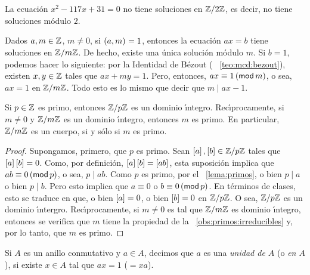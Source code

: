 \begin{ejemModulares}\label{ejem:modulares:motiva:congruencias}
	La ecuaci\'on $x^2-117x+31=0$ no tiene soluciones en $\Enterosmod[2]$,
	es decir, no tiene soluciones m\'odulo $2$.
\end{ejemModulares}

\begin{ejemModulares}\label{ejem:modulares:lineal}
	Dados $a,m\in\Enteros$, $m\neq 0$, si $\mcd{a,m}=1$, entonces la
	ecuaci\'on $ax=b$ tiene soluciones en $\Enterosmod[m]$. De hecho,
	existe una \'unica soluci\'on m\'odulo $m$. Si $b=1$, podemos
	hacer lo siguiente: por la Identidad de B\'ezout (\teoname~%
	\ref{teo:mcd:bezout}), existen $x,y\in\Enteros$ tales que $ax+my=1$.
	Pero, entonces, $ax\equiv 1\tmodulo[m]$, o sea, $ax=1$ en
	$\Enterosmod[m]$. Todo esto es lo mismo que decir que $m\mid ax-1$.
\end{ejemModulares}

\begin{coroModulares}\label{coro:modulares:primo}
	Si $p\in\Enteros$ es primo, entonces $\Enterosmod[p]$ es un dominio
	\'{\i}ntegro. Rec\'{\i}procamente, si $m\neq 0$ y $\Enterosmod[m]$
	es un dominio \'{\i}ntegro, entonces $m$ es primo. En particular,
	$\Enterosmod[m]$ es un cuerpo, si y s\'olo si $m$ es primo.
\end{coroModulares}

\begin{proof}
	Supongamos, primero, que $p$ es primo.
	Sean $\clase a,\clase b\in\Enterosmod[p]$ tales que
	$\clase a\clase b=0$. Como, por definici\'on,
	$\clase a\clase b=\clase{ab}$, esta suposici\'on implica que
	$ab\equiv 0\tmodulo[p]$, o sea, $p\mid ab$. Como $p$ es primo,
	por el \lemaname~\ref{lema:primos}, o bien $p\mid a$ o bien $p\mid b$.
	Pero esto implica que $a\equiv 0$ o $b\equiv 0\tmodulo[p]$.
	En t\'erminos de clases, esto se traduce en que, o bien
	$\clase a=0$, o bien $\clase b=0$ en $\Enterosmod[p]$. O sea,
	$\Enterosmod[p]$ es un dominio \'{\i}ntergro.
	Rec\'{\i}procamente, si $m\neq 0$ es tal que $\Enterosmod[m]$ es
	dominio \'{\i}ntegro, entonces se verifica que $m$ tiene la propiedad
	de la \obsname~\ref{obs:primos:irreducibles} y, por lo tanto, que
	$m$ es primo.
\end{proof}

\begin{defModulares}\label{def:modulares:unidades:anillo}
	Si $A$ es un anillo conmutativo y $a\in A$, decimos que $a$ es una
	\emph{unidad de $A$} (o \emph{en $A$}), si existe $x\in A$ tal que
	$ax=1$ ($=xa$).
\end{defModulares}

